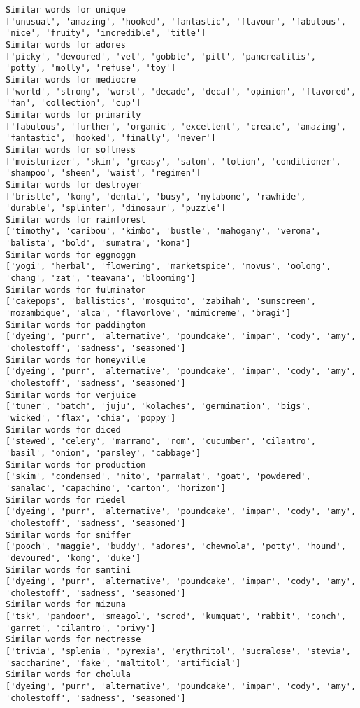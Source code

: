 \documentclass[11pt]{article}
\begin{document}
\begin{Verbatim}[commandchars=\\\{\}]
Similar words for unique
['unusual', 'amazing', 'hooked', 'fantastic', 'flavour', 'fabulous', 'nice', 'fruity', 'incredible', 'title']
Similar words for adores
['picky', 'devoured', 'vet', 'gobble', 'pill', 'pancreatitis', 'potty', 'molly', 'refuse', 'toy']
Similar words for mediocre
['world', 'strong', 'worst', 'decade', 'decaf', 'opinion', 'flavored', 'fan', 'collection', 'cup']
Similar words for primarily
['fabulous', 'further', 'organic', 'excellent', 'create', 'amazing', 'fantastic', 'hooked', 'finally', 'never']
Similar words for softness
['moisturizer', 'skin', 'greasy', 'salon', 'lotion', 'conditioner', 'shampoo', 'sheen', 'waist', 'regimen']
Similar words for destroyer
['bristle', 'kong', 'dental', 'busy', 'nylabone', 'rawhide', 'durable', 'splinter', 'dinosaur', 'puzzle']
Similar words for rainforest
['timothy', 'caribou', 'kimbo', 'bustle', 'mahogany', 'verona', 'balista', 'bold', 'sumatra', 'kona']
Similar words for eggnoggn
['yogi', 'herbal', 'flowering', 'marketspice', 'novus', 'oolong', 'chang', 'zat', 'teavana', 'blooming']
Similar words for fulminator
['cakepops', 'ballistics', 'mosquito', 'zabihah', 'sunscreen', 'mozambique', 'alca', 'flavorlove', 'mimicreme', 'bragi']
Similar words for paddington
['dyeing', 'purr', 'alternative', 'poundcake', 'impar', 'cody', 'amy', 'cholestoff', 'sadness', 'seasoned']
Similar words for honeyville
['dyeing', 'purr', 'alternative', 'poundcake', 'impar', 'cody', 'amy', 'cholestoff', 'sadness', 'seasoned']
Similar words for verjuice
['tuner', 'batch', 'juju', 'kolaches', 'germination', 'bigs', 'wicked', 'flax', 'chia', 'poppy']
Similar words for diced
['stewed', 'celery', 'marrano', 'rom', 'cucumber', 'cilantro', 'basil', 'onion', 'parsley', 'cabbage']
Similar words for production
['skim', 'condensed', 'nito', 'parmalat', 'goat', 'powdered', 'sanalac', 'capachino', 'carton', 'horizon']
Similar words for riedel
['dyeing', 'purr', 'alternative', 'poundcake', 'impar', 'cody', 'amy', 'cholestoff', 'sadness', 'seasoned']
Similar words for sniffer
['pooch', 'maggie', 'buddy', 'adores', 'chewnola', 'potty', 'hound', 'devoured', 'kong', 'duke']
Similar words for santini
['dyeing', 'purr', 'alternative', 'poundcake', 'impar', 'cody', 'amy', 'cholestoff', 'sadness', 'seasoned']
Similar words for mizuna
['tsk', 'pandoor', 'smeagol', 'scrod', 'kumquat', 'rabbit', 'conch', 'garret', 'cilantro', 'privy']
Similar words for nectresse
['trivia', 'splenia', 'pyrexia', 'erythritol', 'sucralose', 'stevia', 'saccharine', 'fake', 'maltitol', 'artificial']
Similar words for cholula
['dyeing', 'purr', 'alternative', 'poundcake', 'impar', 'cody', 'amy', 'cholestoff', 'sadness', 'seasoned']

\end{Verbatim}
\end{document}

